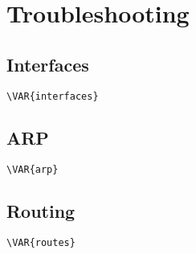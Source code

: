 \documentclass[a4paper]{article}
\begin{document}
\clearpage

\section{Troubleshooting}


\begin{center}
\end{center}



\subsection{Interfaces}


\begin{lstlisting}[language=Bash, caption=Network Interfaces]
\VAR{interfaces}
\end{lstlisting}

\subsection{ARP}


\begin{lstlisting}[language=Bash, caption=ARP]
\VAR{arp}
\end{lstlisting}


\subsection{Routing}


\begin{lstlisting}[language=Bash, caption=TABLE ROUTE]
\VAR{routes}
\end{lstlisting}
\end{document}
